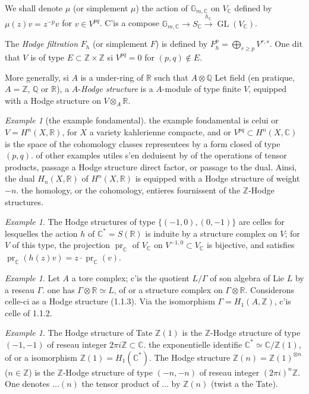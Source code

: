 \documentclass[12pt,a4paper]{article}
\theoremstyle{plain}
\theoremstyle{definition}
\theoremstyle{remark}
\newtheorem{example}[theorem]{Example}
\DeclareMathOperator{\GL}{GL}
\DeclareMathOperator{\pr}{pr}
\newcommand{\ZZ}{\mathbb{Z}}
\newcommand{\QQ}{\mathbb{Q}}
\newcommand{\RR}{\mathbb{R}}
\newcommand{\CC}{\mathbb{C}}
\newcommand{\Gm}{\mathbb{G}}
\begin{document}
We shall denote $\mu$ (or simplement $\mu$) the action of $\Gm_{m,\CC}$ on $V_{\CC}$ defined by $\mu(z)v = z^{-p}v$ for $v \in V^{pq}$. C'is a compose $\Gm_{m,\CC} \to S_{\CC} \xrightarrow{h_{\CC}} \GL(V_{\CC})$.

The \textit{Hodge filtration} $F_h$ (or simplement $F$) is defined by $F_h^p = \bigoplus_{r \ge p} V^{r,s}$. One dit that $V$ is of type $E \subset \ZZ \times \ZZ$ si $V^{pq} = 0$ for $(p,q) \notin E$.

More generally, si $A$ is a under-ring of $\RR$ such that $A \otimes \QQ$ Let field (en pratique, $A = \ZZ$, $\QQ$ or $\RR$), a $A$-\textit{Hodge structure} is a $A$-module of type finite $V$, equipped with a Hodge structure on $V \otimes_A \RR$.

\begin{example}[the example fondamental]
the example fondamental is celui or $V = H^n(X,\RR)$, for $X$ a variety kahlerienne compacte, and or $V^{pq} \subset H^n(X,\CC)$ is the space of the cohomology classes representees by a form closed of type $(p,q)$. of other examples utiles s'en deduisent by of the operations of tensor products, passage a Hodge structure direct factor, or passage to the dual. Ainsi, the dual $H_n(X,\RR)$ of $H^n(X,\RR)$ is equipped with a Hodge structure of weight $-n$. the homology, or the cohomology, entieres fournissent of the $\ZZ$-Hodge structures.
\end{example}

\begin{example}
The Hodge structures of type $\{(-1,0),(0,-1)\}$ are celles for lesquelles the action $h$ of $\CC^* = S(\RR)$ is induite by a structure complex on $V$; for $V$ of this type, the projection $\pr_{\CC}$ of $V_{\CC}$ on $V^{-1,0} \subset V_{\CC}$ is bijective, and satisfies $\pr_{\CC}(h(z)v) = z \cdot \pr_{\CC}(v)$.
\end{example}

\begin{example}
Let $A$ a tore complex; c'is the quotient $L/\Gamma$ of son algebra of Lie $L$ by a reseau $\Gamma$. one has $\Gamma \otimes \RR \simeq L$, of or a structure complex on $\Gamma \otimes \RR$. Considerons celle-ci as a Hodge structure (1.1.3). Via the isomorphism $\Gamma = H_1(A,\ZZ)$, c'is celle of 1.1.2.
\end{example}

\begin{example}
The Hodge structure of Tate $\ZZ(1)$ is the $\ZZ$-Hodge structure of type $(-1,-1)$ of reseau integer $2\pi i \ZZ \subset \CC$. the exponentielle identifie $\CC^* \simeq \CC/\ZZ(1)$, of or a isomorphism $\ZZ(1) = H_1(\CC^*)$. The Hodge structure $\ZZ(n) = \ZZ(1)^{\otimes n}$ ($n \in \ZZ$) is the $\ZZ$-Hodge structure of type $(-n,-n)$ of reseau integer $(2\pi i)^n \ZZ$. One denotes $\dots(n)$ the tensor product of $\dots$ by $\ZZ(n)$ (twist a the Tate).
\end{example}
\end{document}
